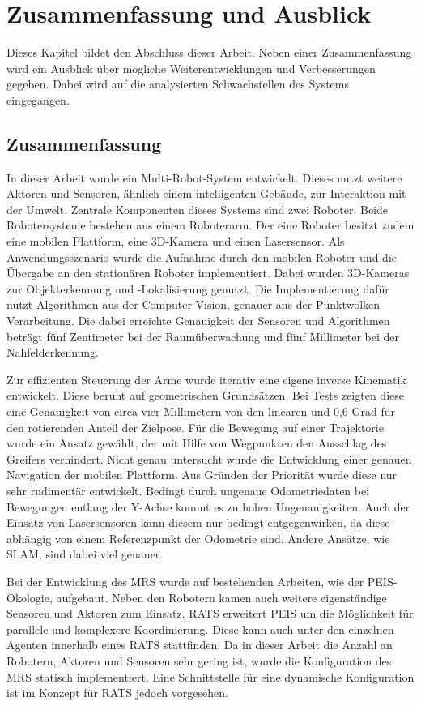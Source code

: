 \section{Zusammenfassung und Ausblick}
\label{sec:end}
Dieses Kapitel bildet den Abschluss dieser Arbeit.  Neben einer Zusammenfassung wird ein Ausblick über mögliche Weiterentwicklungen und Verbesserungen gegeben. Dabei wird auf die analysierten Schwachstellen des Systems eingegangen.

\subsection{Zusammenfassung}
In dieser Arbeit wurde ein Multi-Robot-System entwickelt. Dieses nutzt weitere Aktoren und Sensoren, ähnlich einem intelligenten Gebäude, zur Interaktion mit der Umwelt. Zentrale Komponenten dieses Systems sind zwei Roboter. Beide Robotersysteme bestehen aus einem Roboterarm. Der eine Roboter besitzt zudem eine mobilen Plattform, eine 3D-Kamera und einen Lasersensor. Als Anwendungsszenario wurde die Aufnahme durch den mobilen Roboter und die Übergabe an den stationären Roboter implementiert. Dabei wurden 3D-Kameras zur Objekterkennung und -Lokalisierung genutzt. Die Implementierung dafür nutzt Algorithmen aus der Computer Vision, genauer aus der Punktwolken Verarbeitung. Die dabei erreichte Genauigkeit der Sensoren und Algorithmen beträgt fünf Zentimeter bei der Raumüberwachung und fünf Millimeter bei der Nahfelderkennung. 

Zur effizienten Steuerung der Arme wurde iterativ eine eigene inverse Kinematik entwickelt. Diese beruht auf geometrischen Grundsätzen. Bei Tests zeigten diese eine Genauigkeit von circa vier Millimetern von den linearen und 0,6 Grad für den rotierenden Anteil der Zielpose. Für die Bewegung auf einer Trajektorie wurde ein Ansatz gewählt, der mit Hilfe von Wegpunkten den Ausschlag des Greifers verhindert. Nicht genau untersucht wurde die Entwicklung einer genauen Navigation der mobilen Plattform. Aus Gründen der Priorität wurde diese nur sehr rudimentär entwickelt. Bedingt durch ungenaue Odometriedaten bei Bewegungen entlang der Y-Achse kommt es zu hohen Ungenauigkeiten. Auch der Einsatz von Lasersensoren kann diesem nur bedingt entgegenwirken, da diese abhängig von einem Referenzpunkt der Odometrie sind. Andere Ansätze, wie SLAM, sind dabei viel genauer.

 Bei der Entwicklung des MRS wurde auf bestehenden Arbeiten, wie der PEIS-Ökologie, aufgebaut. Neben den Robotern kamen auch weitere eigenständige Sensoren und Aktoren zum Einsatz. RATS erweitert PEIS um die Möglichkeit für parallele und komplexere Koordinierung. Diese kann auch unter den einzelnen Agenten innerhalb eines RATS stattfinden. Da in dieser Arbeit die Anzahl an Robotern, Aktoren und Sensoren sehr gering ist, wurde die Konfiguration des MRS statisch implementiert. Eine Schnittstelle für eine dynamische Konfiguration ist im Konzept für RATS jedoch vorgesehen.

